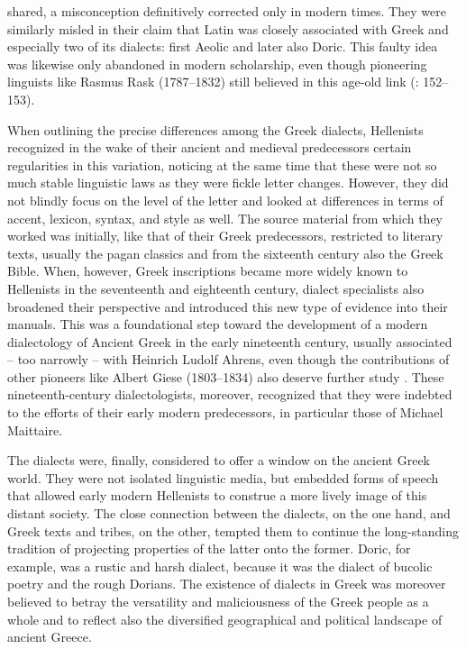 shared, a misconception definitively corrected only in modern times. They were similarly misled in their claim that Latin was closely associated with Greek and especially two of its dialects: first Aeolic and later also Doric. This faulty idea was likewise only abandoned in modern scholarship, even though pioneering linguists like Rasmus Rask (1787–1832) still believed in this age-old link (\citealt{Rask2013}: 152–153).

When outlining the precise differences among the Greek dialects, Hellenists recognized in the wake of their ancient and medieval predecessors certain regularities in this variation, noticing at the same time that these were not so much stable linguistic laws as they were fickle letter changes. However, they did not blindly focus on the level of the letter and looked at differences in terms of accent, lexicon, syntax, and style as well. The source material from which they worked was initially, like that of their Greek predecessors, restricted to literary texts, usually the pagan classics and from the sixteenth century also the Greek Bible. When, however, Greek inscriptions became more widely known to Hellenists in the seventeenth and eighteenth century, dialect specialists also broadened their perspective and introduced this new type of evidence into their manuals. This was a foundational step toward the development of a modern dialectology of Ancient Greek in the early nineteenth century, usually associated – too narrowly – with Heinrich Ludolf Ahrens, even though the contributions of other pioneers like Albert Giese (1803–1834) also deserve further study \citep{Giese1837}. These nineteenth-century dialectologists, moreover, recognized that they were indebted to the efforts of their early modern predecessors, in particular those of Michael Maittaire.

The dialects were, finally, considered to offer a window on the ancient Greek world. They were not isolated linguistic media, but embedded forms of speech that allowed early modern Hellenists to construe a more lively image of this distant society. The close connection between the dialects, on the one hand, and Greek texts and tribes, on the other, tempted them to continue the long-standing tradition of projecting properties of the latter onto the former. Doric, for example, was a rustic and harsh dialect, because it was the dialect of bucolic poetry and the rough Dorians. The existence of dialects in Greek was moreover believed to betray the versatility and maliciousness of the Greek people as a whole and to reflect also the diversified geographical and political landscape of ancient Greece.

